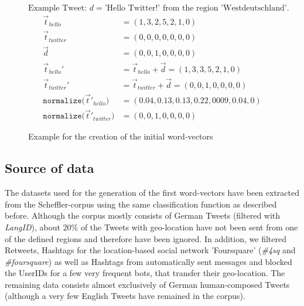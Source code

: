 \documentclass[../Main.tex]{subfiles}
\begin{document}
\begin{figure}
\centering $\textrm{Example Tweet: } d = \textrm{'Hello Twitter!'} \textrm{ from the region 'Westdeutschland'.}$
 \begin{align*}
    \vec{t}_{hello} &= (1,3,2,5,2,1,0) \\
     \vec{t}_{twitter} &= (0,0,0,0,0,0,0) \\
      \vec{d} &= (0,0,1,0,0,0,0) \\
     \vec{t}_{hello}' &= \vec{t}_{hello} + \vec{d} =  (1,3,3,5,2,1,0) \\
    \vec{t}_{twitter} ' &= \vec{t}_{twitter} + \vec{d} = (0,0,1,0,0,0,0) \\
     \texttt{normalize(}\vec{t}'_{hello}\texttt{)} &= (0.04, 0.13, 0.13, 0.22, 0009, 0.04, 0) \\
     \texttt{normalize(}\vec{t}'_{twitter}\texttt{)} &= (0,0,1,0,0,0,0)
  \end{align*}
  \caption{Example for the creation of the initial word-vectors}
  \label{geo_example1}
\end{figure}

\subsection{Source of data}
The datasets used for the generation of the first word-vectors have been extracted from the Scheffler-corpus using the same classification function as described before. Although the corpus mostly consists of German Tweets (filtered with \emph{LangID}), about 20\% of the Tweets with geo-location have not been sent from one of the defined regions and therefore have been ignored. In addition, we filtered Retweets, Hashtags for the location-based social network 'Foursquare' (\emph{\#4sq} and \emph{\#foursquare}) as well as Hashtags from automatically sent messages and blocked the UserIDs for a few very frequent bots, that transfer their geo-location. The remaining data consists almost exclusively of German human-composed Tweets (although a very few English Tweets have remained in the corpus).
\end{document}
